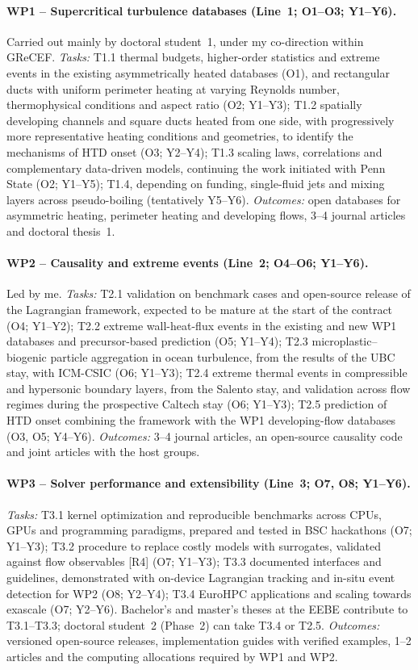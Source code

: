\documentclass[11pt]{article}
\begin{document}
\paragraph{WP1 -- Supercritical turbulence databases (Line~1; O1--O3; Y1--Y6).} Carried out
mainly by doctoral student~1, under my co-direction within GReCEF.
\emph{Tasks:} T1.1 thermal budgets, higher-order statistics and extreme events in the existing
asymmetrically heated databases (O1), and rectangular ducts with uniform perimeter heating at
varying Reynolds number, thermophysical conditions and aspect ratio (O2; Y1--Y3); T1.2 spatially
developing channels and square ducts heated from one side, with progressively more representative
heating conditions and geometries, to identify the mechanisms of HTD onset (O3; Y2--Y4); T1.3
scaling laws, correlations and complementary data-driven models, continuing the work initiated
with Penn State (O2; Y1--Y5); T1.4, depending on funding, single-fluid jets and mixing layers
across pseudo-boiling (tentatively Y5--Y6).
\emph{Outcomes:} open databases for asymmetric heating, perimeter heating and developing flows,
3--4 journal articles and doctoral thesis~1.

\paragraph{WP2 -- Causality and extreme events (Line~2; O4--O6; Y1--Y6).} Led by me.
\emph{Tasks:} T2.1 validation on benchmark cases and open-source release of the Lagrangian
framework, expected to be mature at the start of the contract (O4; Y1--Y2); T2.2 extreme
wall-heat-flux events in the existing and new WP1 databases and precursor-based prediction (O5;
Y1--Y4); T2.3 microplastic--biogenic particle aggregation in ocean turbulence, from the results
of the UBC stay, with ICM-CSIC (O6; Y1--Y3); T2.4 extreme thermal events in compressible and
hypersonic boundary layers, from the Salento stay, and validation across flow regimes during the
prospective Caltech stay (O6; Y1--Y3); T2.5 prediction of HTD onset combining the
framework with the WP1 developing-flow databases (O3, O5; Y4--Y6).
\emph{Outcomes:} 3--4 journal articles, an open-source causality code and joint articles with
the host groups.

\paragraph{WP3 -- Solver performance and extensibility (Line~3; O7, O8; Y1--Y6).}
\emph{Tasks:} T3.1 kernel optimization and reproducible benchmarks across CPUs, GPUs and
programming paradigms, prepared and tested in BSC hackathons (O7; Y1--Y3); T3.2 procedure to
replace costly models with surrogates, validated against flow observables [R4] (O7; Y1--Y3);
T3.3 documented interfaces and guidelines, demonstrated with on-device Lagrangian tracking and
in-situ event detection for WP2 (O8; Y2--Y4); T3.4 EuroHPC applications and scaling towards
exascale (O7; Y2--Y6). Bachelor's and master's theses at the EEBE contribute to T3.1--T3.3;
doctoral student~2 (Phase~2) can take T3.4 or T2.5.
\emph{Outcomes:} versioned open-source releases, implementation guides with verified examples,
1--2 articles and the computing allocations required by WP1 and WP2.
\end{document}
